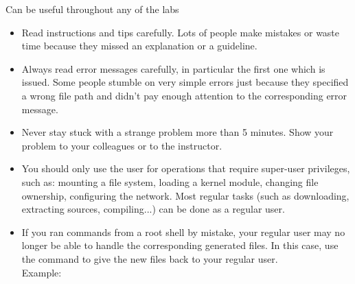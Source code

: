 Can be useful throughout any of the labs

\begin{itemize}

\item Read instructions and tips carefully. Lots of people make
  mistakes or waste time because they missed an explanation or a
  guideline.

\item Always read error messages carefully, in particular the first
  one which is issued. Some people stumble on very simple errors just
  because they specified a wrong file path and didn't pay enough
  attention to the corresponding error message.

\item Never stay stuck with a strange problem more than 5
  minutes. Show your problem to your colleagues or to the instructor.

\item You should only use the  user for operations that require
  super-user privileges, such as: mounting a file system, loading a
  kernel module, changing file ownership, configuring the
  network. Most regular tasks (such as downloading, extracting
  sources, compiling...) can be done as a regular user.

\item If you ran commands from a root shell by mistake, your regular
  user may no longer be able to handle the corresponding generated
  files. In this case, use the  command to give the new
  files back to your regular user.\\
  Example: 

\end{itemize}

